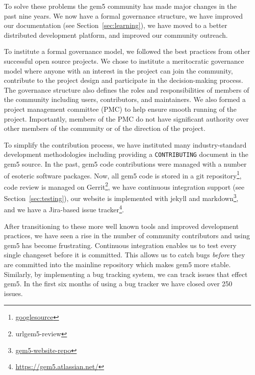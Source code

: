 To solve these problems the gem5 community has made major changes in the past nine years.
We now have a formal governance structure, we have improved our documentation (see Section~\ref{sec:learning}), we have moved to a better distributed development platform, and improved our community outreach.

To institute a formal governance model, we followed the best practices from other successful open source projects.
We chose to institute a meritocratic governance model where anyone with an interest in the project can join the community, contribute to the project design and participate in the decision-making process.
The governance structure also defines the roles and responsibilities of members of the community including users, contributors, and maintainers.
We also formed a project management committee (PMC) to help ensure smooth running of the project.
Importantly, members of the PMC do not have significant authority over other members of the community or of the direction of the project.

To simplify the contribution process, we have instituted many industry-standard development methodologies including providing a \verb|CONTRIBUTING| document in the gem5 source.
In the past, gem5 code contributions were managed with a number of esoteric software packages.
Now, all gem5 code is stored in a git repository\footnote{\url{googlesource}}, code review is managed on Gerrit\footnote{url{gem5-review}}, we have continuous integration support (see Section~\ref{sec:testing}), our website is implemented with jekyll and markdown\footnote{\url{gem5-website-repo}}, and we have a Jira-based issue tracker\footnote{\url{https://gem5.atlassian.net/}}.

After transitioning to these more well known tools and improved development practices, we have seen a rise in the number of community contributors and using gem5 has become frustrating.
Continuous integration enables us to test every single changeset before it is committed.
This allows us to catch bugs \emph{before} they are committed into the mainline repository which makes gem5 more stable.
Similarly, by implementing a bug tracking system, we can track issues that effect gem5.
In the first six months of using a bug tracker we have closed over 250 issues.

